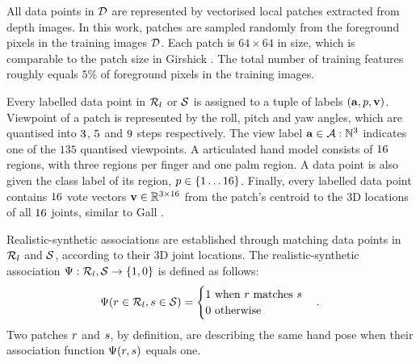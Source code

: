 All data points in $\mathcal{D}$ are represented by vectorised local patches extracted from depth images. In this work, patches are sampled randomly from the foreground pixels in the training images $\mathcal{D}$. Each patch is $64 \times 64$ in size, which is comparable to the patch size in Girshick \etal \cite{Girshick2011}. The total number of training features roughly equals $5\%$ of foreground pixels in the training images. 

Every labelled data point in $\mathcal{R}_{l}$ or $\mathcal{S}$ is assigned to a tuple of labels $(\mathbf{a}, p, \mathbf{v})$. 
Viewpoint of a patch is represented by the roll, pitch and yaw angles, which are quantised into $3$, $5$ and $9$ steps respectively. The view label $\mathbf{a} \in \mathcal{A}:\mathbb{N}^{3}$ indicates one of the $135$ quantised viewpoints.
A articulated hand model consists of $16$ regions, with three regions per finger and one palm region. A data point is also given the class label of its region, $p \in \{1\dots16\}$.   
Finally, every labelled data point contains $16$ vote vectors $\mathbf{v} \in \mathbb{R}^{3\times16}$ from the patch's centroid to the 3D locations of all $16$ joints, similar to Gall \etal \cite{Gall2011}. 

Realistic-synthetic associations are established through matching data points in $\mathcal{R}_{l}$ and $\mathcal{S}$, according to their 3D joint locations.  The realistic-synthetic association $\mathrm{\Psi}: \mathcal{R}_{l},\mathcal{S} \rightarrow \{1,0\}$ is defined as follows:
\begin{equation}
	\mathrm{\Psi}(r \in \mathcal{R}_{l}, s \in \mathcal{S}) =
		\begin{cases}
			1 \mbox{ when $r$ matches $s$} \\
			0 \mbox{ otherwise}
		\end{cases}.
	\label{eq:association}
\end{equation}
Two patches $r$ and $s$, by definition, are describing the same hand pose when their association function $\mathrm{\Psi}(r, s)$ equals one.  


